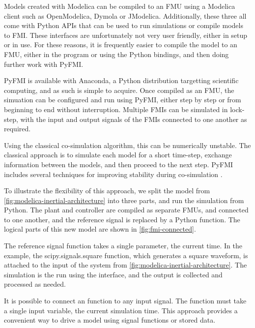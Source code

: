 \documentclass[\rootfolder/main.tex]{subfiles}
\begin{document}
Models created with Modelica can be compiled to an FMU using a Modelica client such as OpenModelica, Dymola or JModelica.
Additionally, these three all come with Python APIs that can be used to run simulations or compile models to FMI.
These interfaces are unfortunately not very user friendly, either in setup or in use.
For these reasons, it is frequently easier to compile the model to an FMU, either in the program or using the Python bindings, and then doing further work with PyFMI.

PyFMI is available with Anaconda, a Python distribution targetting scientific computing, and as such is simple to acquire.
Once compiled as an FMU, the simuation can be configured and run using PyFMI, either step by step or from beginning to end without interruption.
Multiple FMIs can be simulated in lock-step, with the input and output signals of the FMIs connected to one another as required.

Using the classical co-simulation algorithm, this can be numerically unstable.
The classical approach is to simulate each model for a short time-step, exchange information between the models, and then proceed to the next step.
PyFMI includes several techniques for improving stability during co-simulation \cite{Andersson2016}.

To illustrate the flexibility of this approach, we split the model from \cref{fig:modelica-inertial-architecture} into three parts, and run the simulation from Python.
The plant and controller are compiled as separate FMUs, and connected to one another, and the reference signal is replaced by a Python function.
The logical parts of this new model are shown in \cref{fig:fmi-connected}.

The reference signal function takes a single parameter, the current time.
In the example, the scipy.signals.square function, which generates a square waveform, is attached to the input of the system from \cref{fig:modelica-inertial-architecture}.
The simulation is the run using the interface, and the output is collected and processed as needed.

It is possible to connect an function to any input signal.
The function must take a single input variable, the current simulation time.
This approach provides a convenient way to drive a model using signal functions or stored data.
\end{document}
